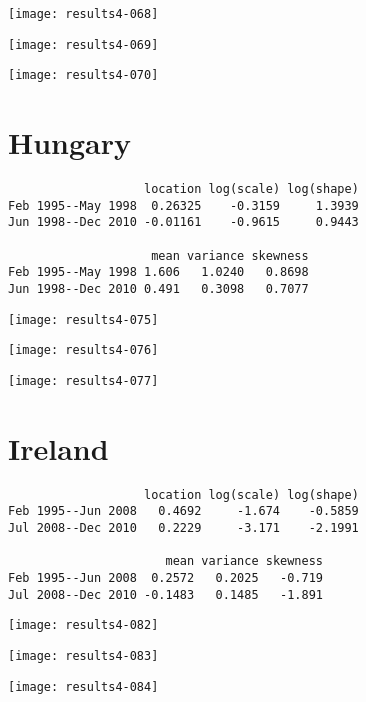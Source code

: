 \documentclass[a4paper]{article}
\begin{document}
\begin{center}
\texttt{[image: results4-068]}

\texttt{[image: results4-069]}

\texttt{[image: results4-070]}
\end{center}


\newpage

\section*{Hungary}


\begin{verbatim}
                   location log(scale) log(shape)
Feb 1995--May 1998  0.26325    -0.3159     1.3939
Jun 1998--Dec 2010 -0.01161    -0.9615     0.9443

                    mean variance skewness
Feb 1995--May 1998 1.606   1.0240   0.8698
Jun 1998--Dec 2010 0.491   0.3098   0.7077

\end{verbatim}

\begin{center}
\texttt{[image: results4-075]}

\texttt{[image: results4-076]}

\texttt{[image: results4-077]}
\end{center}


\newpage

\section*{Ireland}


\begin{verbatim}
                   location log(scale) log(shape)
Feb 1995--Jun 2008   0.4692     -1.674    -0.5859
Jul 2008--Dec 2010   0.2229     -3.171    -2.1991

                      mean variance skewness
Feb 1995--Jun 2008  0.2572   0.2025   -0.719
Jul 2008--Dec 2010 -0.1483   0.1485   -1.891

\end{verbatim}

\begin{center}
\texttt{[image: results4-082]}

\texttt{[image: results4-083]}

\texttt{[image: results4-084]}
\end{center}
\end{document}
